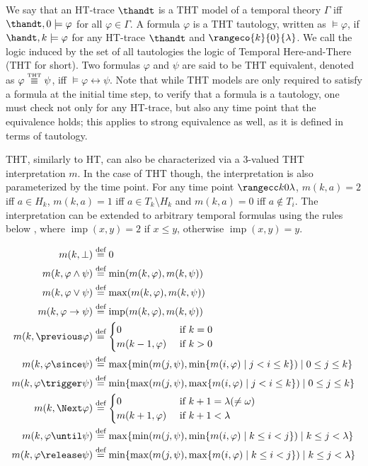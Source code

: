 We say that an HT-trace $\thandt$ is a THT model of a temporal theory
$\Gamma$ iff $\thandt,0 \models \varphi$ for all $\varphi \in
\Gamma$. A formula $\varphi$ is a THT tautology, written as
$\models \varphi$, if $\handt,k \models \varphi$ for any HT-trace
$\thandt$ and $\rangeco{k}{0}{\lambda}$. We call the logic induced by
the set of all tautologies the logic of Temporal Here-and-There (THT
for short). Two formulas $\varphi$ and $\psi$ are said to be THT
equivalent, denoted as $\varphi \stackrel{\normalfont\mbox{\tiny THT}}{\equiv} \psi$, iff
$\models \varphi \leftrightarrow \psi$. Note that while THT models are
only required to satisfy a formula at the initial time step, to verify
that a formula is a tautology, one must check not only for any
HT-trace, but also any time point that the equivalence holds; this
applies to strong equivalence as well, as it is defined in terms of
tautology.

THT, similarly to HT, can also be characterized via a 3-valued THT
interpretation $m$. In the case of THT though, the interpretation is
also parameterized by the time point. For any time point $\kinlambda$,
$m(k,a)=2$ iff $a \in H_k$, $m(k,a)=1$ iff $a \in T_k \setminus H_k$
and $m(k,a)=0$ iff $a \not\in T_i$. The interpretation can be extended
to arbitrary temporal formulas using the rules below
\cite{agcadipescscvi20a}, where $\operatorname{imp}(x,y)=2$ if
$x \leq y$, otherwise $\operatorname{imp}(x,y)=y$.

\begin{align*}
  m(k, \perp) &\defeq 0 \\
  m(k, \varphi \wedge \psi) &\defeq \min (m(k, \varphi), m(k, \psi)) \\
  m(k, \varphi \vee \psi) &\defeq \max (m(k, \varphi), m(k, \psi)) \\
  m(k, \varphi \rightarrow \psi) &\defeq \operatorname{imp}(m(k, \varphi), m(k, \psi)) \\
  m(k, \previous \varphi) &\defeq \begin{cases}
    0 & \text { if } k=0 \\
    m(k-1, \varphi) & \text { if } k>0
  \end{cases} \\
 m(k, \varphi \since \psi) &\defeq \max \{\min (m(j, \psi), \min \{m(i, \varphi) \mid j<i \leq k\}) \mid 0 \leq j \leq k\} \\
 m(k, \varphi \trigger \psi) &\defeq \min \{\max (m(j, \psi), \max \{m(i, \varphi) \mid j<i \leq k\}) \mid 0 \leq j \leq k\} \\
 m(k, \Next \varphi) &\defeq \begin{cases}0 & \text { if } k+1=\lambda(\neq \omega) \\
m(k+1, \varphi) & \text { if } k+1<\lambda\end{cases} \\
 m(k, \varphi \until \psi) &\defeq \max \{\min (m(j, \psi), \min \{m(i, \varphi) \mid k \leq i<j\}) \mid k \leq j<\lambda\} \\
 m(k, \varphi \release \psi) &\defeq \min \{\max (m(j, \psi), \max \{m(i, \varphi) \mid k \leq i<j\}) \mid k \leq j<\lambda\}
\end{align*}

